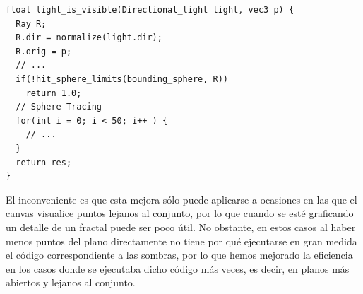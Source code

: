 \begin{lstlisting}
float light_is_visible(Directional_light light, vec3 p) {
  Ray R;
  R.dir = normalize(light.dir);
  R.orig = p;
  // ... 
  if(!hit_sphere_limits(bounding_sphere, R))
    return 1.0;
  // Sphere Tracing
  for(int i = 0; i < 50; i++ ) {
    // ... 
  }
  return res;
}
\end{lstlisting}

El inconveniente es que esta mejora sólo puede aplicarse a ocasiones en las que el canvas visualice puntos lejanos al conjunto, por lo que cuando se esté graficando un detalle de un fractal puede ser poco útil. No obstante, en estos casos al haber menos puntos del plano directamente no tiene por qué ejecutarse en gran medida el código correspondiente a las sombras, por lo que hemos mejorado la eficiencia en los casos donde se ejecutaba dicho código más veces, es decir, en planos más abiertos y lejanos al conjunto.
